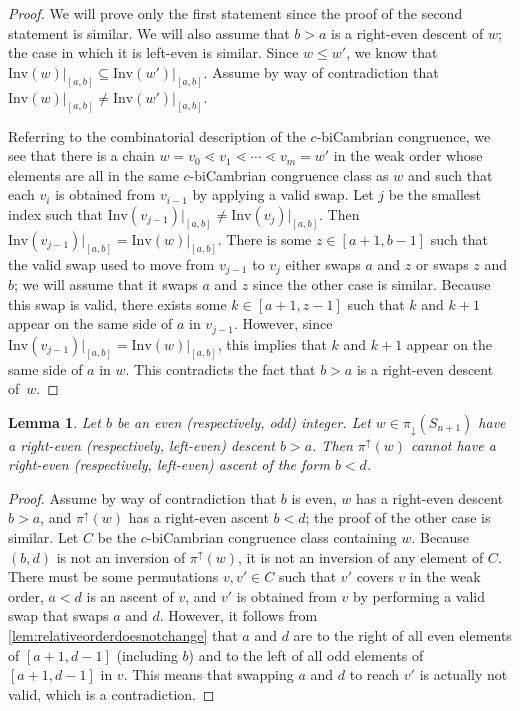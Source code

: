 \documentclass[11pt]{amsart}
\newtheorem{lemma}[theorem]{Lemma}
\theoremstyle{definition}
\newcommand{\Inv}{\mathrm{Inv}}
\begin{document}
\begin{proof}
    We will prove only the first statement since the proof of the second statement is similar. We will also assume that $b>a$ is a right-even descent of $w$; the case in which it is left-even is similar. Since $w\leq w'$, we know that $\Inv(w)\vert_{[a,b]}\subseteq\Inv(w')\vert_{[a,b]}$. Assume by way of contradiction that $\Inv(w)\vert_{[a,b]}\neq\Inv(w')\vert_{[a,b]}$. 
    
    Referring to the combinatorial description of the $c$-biCambrian congruence, we see that there is a chain $w=v_0\lessdot v_1\lessdot\cdots\lessdot v_m=w'$ in the weak order whose elements are all in the same $c$-biCambrian congruence class as $w$ and such that each $v_i$ is obtained from $v_{i-1}$ by applying a valid swap. Let $j$ be the smallest index such that $\Inv(v_{j-1})\vert_{[a,b]}\neq \Inv(v_{j})\vert_{[a,b]}$. Then $\Inv(v_{j-1})\vert_{[a,b]}= \Inv(w)\vert_{[a,b]}$. There is some $z\in[a+1,b-1]$ such that the valid swap used to move from $v_{j-1}$ to $v_j$ either swaps $a$ and $z$ or swaps $z$ and $b$; we will assume that it swaps $a$ and $z$ since the other case is similar. Because this swap is valid, there exists some $k\in[a+1,z-1]$ such that $k$ and $k+1$ appear on the same side of $a$ in $v_{j-1}$. However, since $\Inv(v_{j-1})\vert_{[a,b]}=\Inv(w)\vert_{[a,b]}$, this implies that $k$ and $k+1$ appear on the same side of $a$ in $w$. This contradicts the fact that $b>a$ is a right-even descent of~$w$. 
\end{proof}

\begin{lemma}\label{lem:cannotgofromdescenttoascent}
    Let $b$ be an even (respectively, odd) integer. Let $w\in \pi_\downarrow(S_{n+1})$ have a right-even (respectively, left-even) descent $b>a$. Then $\pi^\uparrow(w)$ cannot have a right-even (respectively, left-even) ascent of the form $b<d$.
\end{lemma}

\begin{proof}
Assume by way of contradiction that $b$ is even, $w$ has a right-even descent $b>a$, and $\pi^\uparrow(w)$ has a right-even ascent $b<d$; the proof of the other case is similar. Let $C$ be the $c$-biCambrian congruence class containing $w$. Because $(b,d)$ is not an inversion of $\pi^\uparrow(w)$, it is not an inversion of any element of $C$. There must be some permutations $v,v'\in C$ such that $v'$ covers $v$ in the weak order, $a<d$ is an ascent of $v$, and $v'$ is obtained from $v$ by performing a valid swap that swaps $a$ and $d$. However, it follows from \cref{lem:relativeorderdoesnotchange} that $a$ and $d$ are to the right of all even elements of $[a+1,d-1]$ (including $b$) and to the left of all odd elements of $[a+1,d-1]$ in $v$. This means that swapping $a$ and $d$ to reach $v'$ is actually not valid, which is a contradiction. 
\end{proof}
\end{document}
